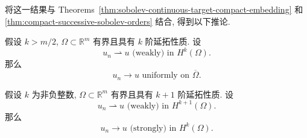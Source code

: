 将这一结果与 Theorems~\ref{thm:sobolev-continuous-target-compact-embedding} 和 \ref{thm:compact-successive-sobolev-orders} 结合, 得到以下推论.

\begin{Corollary}
\label{cor:compact-sobolev-weak-to-uniform}
假设 $k>m/2$, $\Omega\subset\mathbb{R}^m$ 有界且具有 $k$ 阶延拓性质. 设
\begin{equation}\label{eq:compact-sobolev-weak-to-uniform-hypothesis}
u_n\rightharpoonup u\text{ (weakly) in }H^k(\Omega).
\end{equation}
那么
\begin{equation}\label{eq:compact-sobolev-weak-to-uniform-conclusion}
u_n\to u\text{ uniformly on }\overline\Omega.
\end{equation}

\end{Corollary}

\begin{Corollary}
\label{cor:compact-sobolev-weak-to-lower-strong}
假设 $k$ 为非负整数, $\Omega\subset\mathbb{R}^m$ 有界且具有 $k+1$ 阶延拓性质. 设
\begin{equation}\label{eq:compact-sobolev-successive-order-weak-hypothesis}
u_n\rightharpoonup u\text{ (weakly) in }H^{k+1}(\Omega).
\end{equation}
那么
\begin{equation}\label{eq:compact-sobolev-successive-order-strong-conclusion}
u_n\to u\text{ (strongly) in }H^k(\Omega).
\end{equation}

\end{Corollary}

